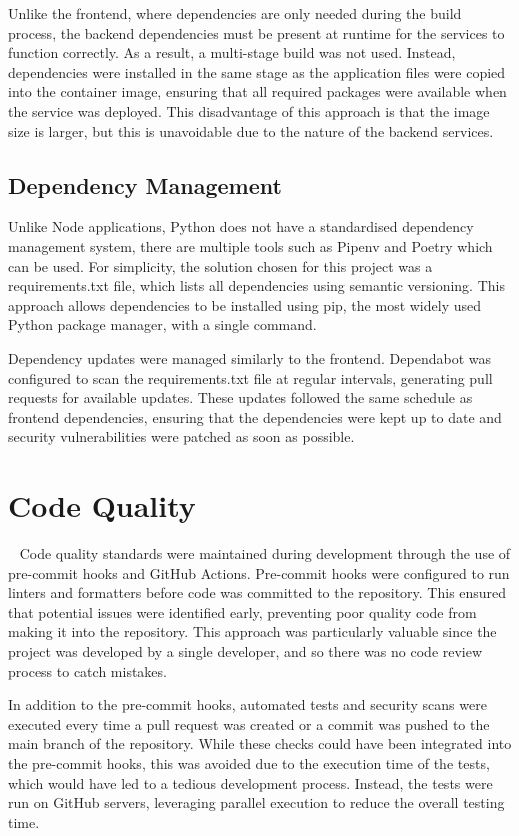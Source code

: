 Unlike the frontend, where dependencies are only needed during the build process, the backend dependencies must be present at runtime for the services to function correctly. As a result, a multi-stage build was not used. Instead, dependencies were installed in the same stage as the application files were copied into the container image, ensuring that all required packages were available when the service was deployed. This disadvantage of this approach is that the image size is larger, but this is unavoidable due to the nature of the backend services.

\subsection{Dependency Management}
Unlike Node applications, Python does not have a standardised dependency management system, there are multiple tools such as Pipenv and Poetry which can be used. For simplicity, the solution chosen for this project was a requirements.txt file, which lists all dependencies using semantic versioning. This approach allows dependencies to be installed using pip, the most widely used Python package manager, with a single command.

Dependency updates were managed similarly to the frontend. Dependabot was configured to scan the requirements.txt file at regular intervals, generating pull requests for available updates. These updates followed the same schedule as frontend dependencies, ensuring that the dependencies were kept up to date and security vulnerabilities were patched as soon as possible.

\section{Code Quality}~\label{sec:code-quality}
Code quality standards were maintained during development through the use of pre-commit hooks and GitHub Actions. Pre-commit hooks were configured to run linters and formatters before code was committed to the repository. This ensured that potential issues were identified early, preventing poor quality code from making it into the repository. This approach was particularly valuable since the project was developed by a single developer, and so there was no code review process to catch mistakes.

In addition to the pre-commit hooks, automated tests and security scans were executed every time a pull request was created or a commit was pushed to the main branch of the repository. While these checks could have been integrated into the pre-commit hooks, this was avoided due to the execution time of the tests, which would have led to a tedious development process. Instead, the tests were run on GitHub servers, leveraging parallel execution to reduce the overall testing time.

